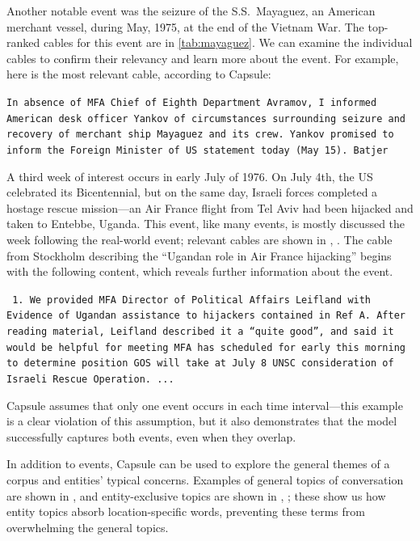 Another notable event was the seizure of the S.S.~Mayaguez, an
American merchant vessel, during May, 1975, at the end of the Vietnam
War. The top-ranked cables for this event are in
\cref{tab:mayaguez}. We can examine the individual cables to confirm
their relevancy and learn more about the event. For example, here is
the most relevant cable, according to Capsule:
\begin{shaded*} \tt{In absence of MFA Chief of Eighth Department Avramov, I
informed American desk officer Yankov of circumstances surrounding seizure
and recovery of merchant ship Mayaguez and its crew.  Yankov promised to
inform the Foreign Minister of US statement today  (May 15).
Batjer
}
\end{shaded*}


A third week of interest occurs in early July of 1976.  On July 4th, the US celebrated its Bicentennial, but on the same day, Israeli forces completed a hostage rescue mission---an Air France flight from Tel Aviv had been hijacked and taken to Entebbe, Uganda.  This event, like many events, is mostly discussed the week following the real-world event; relevant cables are shown in , .
The cable from Stockholm describing the ``Ugandan role in Air France hijacking'' begins with the following content, which reveals further information about the event.
\begin{shaded*} \tt{
1. We provided MFA Director of Political Affairs
Leifland with Evidence of Ugandan assistance to
hijackers contained in Ref A.  After reading material,{}
Leifland described it a ``quite good'', and said it{}
would be helpful for meeting MFA has scheduled for
early this morning to determine position GOS will take
at July 8 UNSC consideration of Israeli Rescue Operation. ...
}
\end{shaded*}
Capsule assumes that only one event occurs in each time interval---this example is a clear violation of this assumption, but it also demonstrates that the model successfully captures both events, even when they overlap.


In addition to events, Capsule can be used to explore the general themes of a corpus and entities' typical concerns.  Examples of general topics of conversation are shown in ,  and entity-exclusive topics are shown in , ; these show us how entity topics absorb location-specific words, preventing these terms from overwhelming the general topics.

